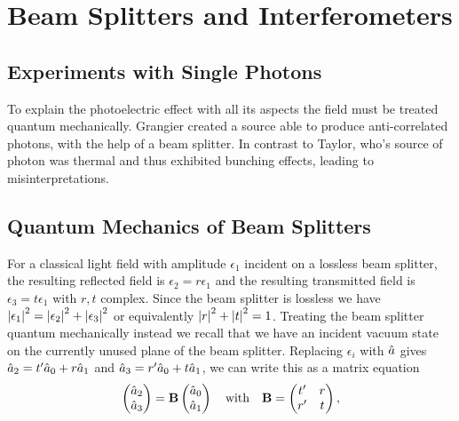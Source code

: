 \section{Beam Splitters and Interferometers}

\subsection{Experiments with Single Photons}
To explain the photoelectric effect with all its aspects the field must be treated quantum mechanically. Grangier created a source able to produce anti-correlated photons, with the help of a beam splitter. In contrast to Taylor, who's source of photon was thermal and thus exhibited bunching effects, leading to misinterpretations.

\subsection{Quantum Mechanics of Beam Splitters}
For a classical light field with amplitude $\epsilon_1$ incident on a lossless beam splitter, the resulting reflected field is $\epsilon_2 = r\epsilon_1$ and the resulting transmitted field is $\epsilon_3 = t\epsilon_1$ with $r,t$ complex. Since the beam splitter is lossless we have $\abs{\epsilon_1}^2 = \abs{\epsilon_2}^2 + \abs{\epsilon_3}^2$ or equivalently $\abs{r}^2 + \abs{t}^2 = 1$. Treating the beam splitter quantum mechanically instead we recall that we have an incident vacuum state on the currently unused plane of the beam splitter. Replacing $\epsilon_i$ with $\hat{a}$ gives $\hat{a}_2 = t'\hat{a}_0 + r\hat{a}_1$ and $\hat{a}_3 = r'\hat{a}_0 + t\hat{a}_1$, we can write this as a matrix equation 
\begin{equation}
    \begin{pmatrix}
        \hat{a}_2\\
        \hat{a}_3
    \end{pmatrix}
    =
    \bm{\mathrm{B}}
    \begin{pmatrix}
        \hat{a}_0\\
        \hat{a}_1
    \end{pmatrix}
    \quad\text{with}\quad \bm{\mathrm{B}} =
    \begin{pmatrix}
        t' & r\\
        r' & t
    \end{pmatrix},
\end{equation}
